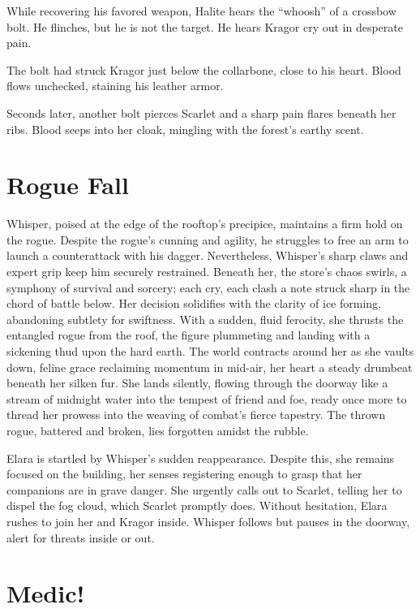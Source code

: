 \documentclass[
  letterpaper,12pt,twoside,twocolumn,openany,
  nodeprecatedcode,bg=full]{dndbook}
\begin{document}
While recovering his favored weapon, Halite hears the ``whoosh'' of a
crossbow bolt. He flinches, but he is not the target. He hears Kragor
cry out in desperate pain.

The bolt had struck Kragor just below the collarbone, close to his
heart. Blood flows unchecked, staining his leather armor.

Seconds later, another bolt pierces Scarlet and a sharp pain flares
beneath her ribs. Blood seeps into her cloak, mingling with the forest's
earthy scent.

\section{Rogue Fall}\label{rogue-fall}

Whisper, poised at the edge of the rooftop's precipice, maintains a firm
hold on the rogue. Despite the rogue's cunning and agility, he struggles
to free an arm to launch a counterattack with his dagger. Nevertheless,
Whisper's sharp claws and expert grip keep him securely restrained.
Beneath her, the store's chaos swirls, a symphony of survival and
sorcery; each cry, each clash a note struck sharp in the chord of battle
below. Her decision solidifies with the clarity of ice forming,
abandoning subtlety for swiftness. With a sudden, fluid ferocity, she
thrusts the entangled rogue from the roof, the figure plummeting and
landing with a sickening thud upon the hard earth. The world contracts
around her as she vaults down, feline grace reclaiming momentum in
mid-air, her heart a steady drumbeat beneath her silken fur. She lands
silently, flowing through the doorway like a stream of midnight water
into the tempest of friend and foe, ready once more to thread her
prowess into the weaving of combat's fierce tapestry. The thrown rogue,
battered and broken, lies forgotten amidst the rubble.

Elara is startled by Whisper's sudden reappearance. Despite this, she
remains focused on the building, her senses registering enough to grasp
that her companions are in grave danger. She urgently calls out to
Scarlet, telling her to dispel the fog cloud, which Scarlet promptly
does. Without hesitation, Elara rushes to join her and Kragor inside.
Whisper follows but pauses in the doorway, alert for threats inside or
out.

\section{Medic!}\label{medic}
\end{document}
